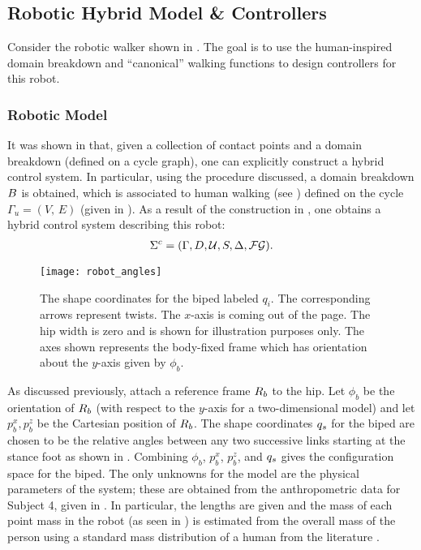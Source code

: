 



\subsection{Robotic Hybrid Model \& Controllers}

Consider the robotic walker shown in .
%
The goal is to use the human-inspired domain breakdown and ``canonical'' walking
functions to design controllers for this robot.


\subsubsection{Robotic Model}

It was shown in  that, given a collection of contact
points and a domain breakdown (defined on a cycle graph), one can explicitly
construct a hybrid control system.
%
In particular, using the procedure discussed, a domain breakdown $B$ is
obtained, which is associated to human walking (see
) defined on the cycle $\Gamma_u = (V, \, E)$ (given
in ).
%
As a result of the construction in , one obtains a
hybrid control system describing this robot:
%
\begin{align}
  \label{eq:hcstime}
  \Sigma^{c} = (\Gamma, D, \mathcal{U}, S, \Delta, \mathcal{FG}).
\end{align}
%
\begin{figure}[t!]
  \centering
  \texttt{[image: robot\_angles]}
  \caption[The shape coordinates for the biped labeled $q_i$.]{The shape
    coordinates for the biped labeled $q_i$.
    The corresponding arrows represent twists. The $x$-axis is coming out of the
    page.
    The hip width is zero and is shown for illustration purposes only.
    The axes shown represents the body-fixed frame which has orientation about
    the $y$-axis given by $\phi_b$.}
  \label{fig:shapecoords}
\end{figure}
%
As discussed previously, attach a reference frame $R_{b}$ to the hip. Let $\phi_b$
be the orientation of $R_{b}$ (with respect to the $y$-axis for a two-dimensional
model) and let $p_b^x, p_b^z$ be the Cartesian position of $R_{b}$.
%
The shape coordinates $q_{s}$ for the biped are chosen to be the relative angles
between any two successive links starting at the stance foot as shown in
.
%
Combining $\phi_b$, $p_b^x$, $p_b^z$, and $q_{s}$ gives the configuration space
for the biped.
%
The only unknowns for the model are the physical parameters of the system;
%
these are obtained from the anthropometric data for Subject 4, given in
.
%
In particular, the lengths are given and the mass of each point mass in the
robot (as seen in ) is estimated from the overall
mass of the person using a standard mass distribution of a human from the
literature \cite{Winter2009}.


